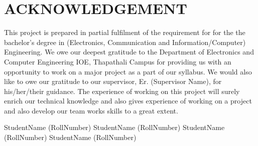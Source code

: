
\newpage
\section*{ACKNOWLEDGEMENT}
This project is prepared in partial fulfilment of the requirement for for the the bachelor's degree in (Electronics, Communication and Information/Computer) Engineering. We owe our deepest gratitude to the Department of Electronics and Computer Engineering IOE, Thapathali Campus for providing us with an opportunity to work on a major project
as a part of our syllabus. We would also like to owe our gratitude to our supervisor, Er. (Supervisor Name), for his/her/their guidance. The experience of working on this project will surely enrich our
technical knowledge and also gives experience of working on a project and also develop
our team works skills to a great extent.

\vskip 1mm
  {\bf}
StudentName \hspace{1.1cm}(RollNumber)
\vskip 1mm
StudentName \hspace{1.1cm}(RollNumber)
\vskip 1mm
StudentName \hspace{1.1cm}(RollNumber)
\vskip 1mm
StudentName \hspace{1.1cm}(RollNumber)